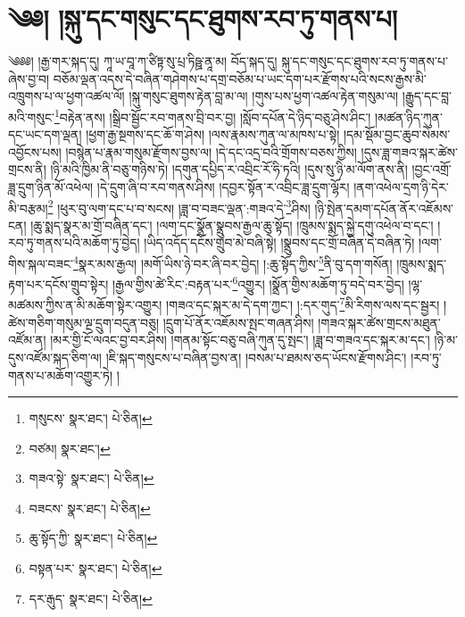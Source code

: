 \setcounter{footnote}{0} 
\chapter{༄༅། །སྐུ་དང་གསུང་དང་ཐུགས་རབ་ཏུ་གནས་པ།}༄༅༅། །རྒྱ་གར་སྐད་དུ། ཀཱ་ཡ་བཱ་ཀ་ཙིཏྟ་སུ་པྲ་ཏིཥྛ་ནཱ་མ། བོད་སྐད་དུ། སྐུ་དང་གསུང་དང་ཐུགས་རབ་ཏུ་གནས་པ་ཞེས་བྱ་བ། བཅོམ་ལྡན་འདས་དེ་བཞིན་གཤེགས་པ་དགྲ་བཅོམ་པ་ཡང་དག་པར་རྫོགས་པའི་སངས་རྒྱས་མི་འཁྲུགས་པ་ལ་ཕྱག་འཚལ་ལོ། །སྐུ་གསུང་ཐུགས་རྟེན་བླ་མ་ལ། །གུས་པས་ཕྱག་འཚལ་རྟེན་གསུམ་ལ། །རྒྱུད་དང་བླ་མའི་གསུང་\footnote{གསུངས་  སྣར་ཐང་།  པེ་ཅིན། }བརྟེན་ནས། །སྒྲིབ་སྦྱོང་རབ་གནས་བྲི་བར་བྱ། །སློབ་དཔོན་དེ་ཉིད་བཅུ་ཤེས་ཤིང་། །མཚན་ཉིད་ཀུན་དང་ཡང་དག་ལྡན། །ཕྱག་རྒྱ་སྔགས་དང་ཆོ་ག་ཤེས། །ལས་རྣམས་ཀུན་ལ་མཁས་པ་སྟེ། །དམ་སྡོམ་བྱང་ཆུབ་སེམས་འབྱོངས་པས། །བསྙེན་པ་རྣམ་གསུམ་རྫོགས་བྱས་ལ། །དེ་དང་འདྲ་བའི་གྲོགས་བཅས་ཀྱིས། །དུས་ཟླ་གཟའ་སྐར་ཚེས་གྲངས་ནི། །ཉི་མའི་ཁྱིམ་ནི་བཅུ་གཉིས་ཏེ། །དགུན་དཔྱིད་ར་འབྲིང་རོ་ཧི་ཏའི། །དུས་སུ་ཉི་མ་ལོག་ནས་ནི། །བྱང་འགྲོ་ཟླ་དྲུག་ཉིན་མོ་འཕེལ། །དེ་དྲུག་ཞི་བ་རབ་གནས་ཤིས། །དབྱར་སྟོན་ར་འབྲིང་ཟླ་དྲུག་ལྷོར། །ནག་འཕེལ་དྲག་ཉི་དེར་མི་བརྩམ།\footnote{བཙམ།  སྣར་ཐང་། } །ཕུར་བུ་ལག་དང་པ་བ་སངས། །ཟླ་བ་བཟང་ལྡན་:གཟའ་དེ་\footnote{གཟའ་སྟེ་  སྣར་ཐང་།  པེ་ཅིན། }ཤིས། །ཉི་སྤེན་དམག་དཔོན་ནོར་འཇོམས་ངན། །ཆུ་སྨད་སྣར་མ་གྲོ་བཞིན་དང་། །ལག་དང་སྣྲོན་སྣྲུབས་རྒྱལ་ཆུ་སྟོད། །ཁྲུམས་སྨད་སྐྱེ་དགུ་འཕེལ་བ་དང་། །རབ་ཏུ་གནས་པའི་མཆོག་ཏུ་བྱེད། །ཡིད་འདོད་དངོས་གྲུབ་མེ་བཞི་སྟེ། །སྣྲུབས་དང་གྲོ་བཞིན་དེ་བཞིན་ཏེ། །ལག་གིས་སྐལ་བཟང་\footnote{བཟངས་  སྣར་ཐང་།  པེ་ཅིན། }སྣར་མས་རྒྱལ། །མགོ་ཡིས་ཉེ་བར་ཞི་བར་བྱེད། །:ཆུ་སྟོད་ཀྱིས་\footnote{ཆུ་སྟོད་ཀྱི་  སྣར་ཐང་།  པེ་ཅིན། }ནི་བུ་དག་གསོན། །ཁྲུམས་སྨད་རྟག་པར་དངོས་གྲུབ་སྟེར། །རྒྱལ་གྱིས་ཚེ་རིང་:བརྟན་པར་\footnote{བསྟན་པར་  སྣར་ཐང་།  པེ་ཅིན། }འགྱུར། །སྣྲོན་གྱིས་མཆོག་ཏུ་བདེ་བར་བྱེད། །ལྷ་མཚམས་ཀྱིས་ན་མི་མཆོག་སྟེར་འགྱུར། །གཟའ་དང་སྐར་མ་དེ་དག་ཀྱང་། །:དར་གུད་\footnote{དར་རྒུད་  སྣར་ཐང་།  པེ་ཅིན། }མི་རིགས་ལས་དང་སྦྱར། །ཚེས་གཅིག་གསུམ་ལྔ་དྲུག་བདུན་བཅུ། །དྲུག་པོ་ནོར་འཇོམས་སྤང་གཞན་ཤིས། །གཟའ་སྐར་ཚེས་གྲངས་མཐུན་འཛོམ་ན། །མར་གྱི་ངོ་ལའང་བྱ་བར་ཤིས། །གནམ་སྟོང་བཅུ་བཞི་ཀུན་དུ་སྤང་། །ཟླ་བ་གཟའ་དང་སྐར་མ་དང་། །ཉི་མ་དུས་འཛོམ་སྐད་ཅིག་ལ། །ཇི་སྐད་གསུངས་པ་བཞིན་བྱས་ན། །བསམ་པ་ཐམས་ཅད་ཡོངས་རྫོགས་ཤིང་། །རབ་ཏུ་གནས་པ་མཆོག་འགྱུར་ཏེ། །
